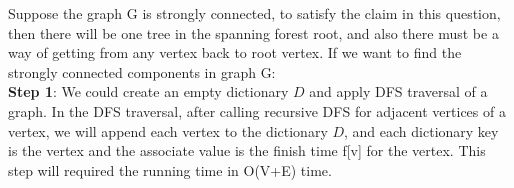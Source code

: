 \documentclass{article}
\begin{document}
\begin{center}
\end{center}

\noindent Suppose the graph G is strongly connected, to satisfy the claim in this question, then there will be one tree in the spanning forest root, and also there must be a way of getting from any vertex back to root vertex. If we want to find the strongly connected components in graph G:\\

\noindent \textbf{Step 1}:  We could create an empty dictionary $D$ and apply DFS traversal of a graph. In the DFS traversal, after calling recursive DFS for adjacent vertices of a vertex, we will append each vertex to the dictionary $D$, and each dictionary key is the vertex and the associate  value is the finish time f[v] for the vertex. This step will required the running time in O(V+E) time.\\
\end{document}
